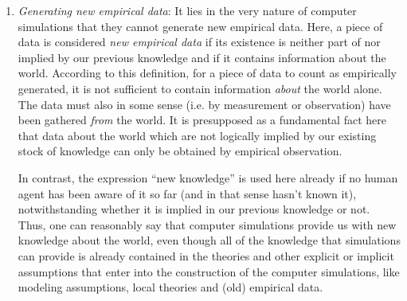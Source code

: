 \documentclass[onecollarge]{STJour}
\numberwithin{equation}{section}
\begin{document}
\begin{enumerate}
 \item \emph{Generating new empirical data}: \label{empiricalData} It lies in the very nature of computer simulations that they cannot generate new empirical data. Here, a piece of data is considered \emph{new empirical data} if its existence is neither part of nor implied by our previous knowledge and if it contains information about the world. According to this definition, for a piece of data to count as empirically generated, it is not sufficient to contain information \emph{about} the world alone. The data must also in some sense (i.e. by measurement or observation) have been gathered \emph{from} the world. It is presupposed as a fundamental fact here that data about the world which are not logically implied by our existing stock of knowledge can only be obtained by empirical observation. 
  
  In contrast, the expression ``new knowledge'' is used here already if no human agent has been aware of it so far (and in that sense hasn't known it), notwithstanding whether it is implied in our previous knowledge or not. Thus, one can reasonably say that computer simulations provide us with new knowledge about the world, even though all of the knowledge that simulations can provide is already contained in the theories and other explicit or implicit assumptions that enter into the construction of the computer simulations, like modeling assumptions, local theories and (old) empirical data.


\end{enumerate}
\end{document}

